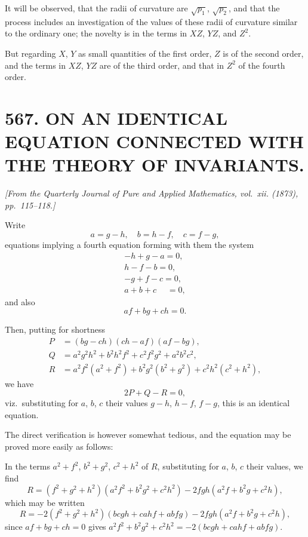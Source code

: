 \documentclass[11pt,a4paper]{article}
\theoremstyle{plain}
\theoremstyle{definition}
\theoremstyle{remark}
\newcommand{\paper}[2]{\section*{#1 #2}}
\newcommand{\papersource}[1]{\par\noindent\textit{#1}\par\medskip}
\begin{document}
It will be observed, that the radii of curvature are $\sqrt{p_1}$, $\sqrt{p_2}$, and that the process includes an investigation of the values of these radii of curvature similar to the ordinary one; the novelty is in the terms in $XZ$, $YZ$, and $Z^2$.

But regarding $X$, $Y$ as small quantities of the first order, $Z$ is of the second order, and the terms in $XZ$, $YZ$ are of the third order, and that in $Z^2$ of the fourth order.

\newpage
\paper{567.}{ON AN IDENTICAL EQUATION CONNECTED WITH THE THEORY OF INVARIANTS.}

\papersource{[From the Quarterly Journal of Pure and Applied Mathematics, vol.~xii. (1873), pp.~115--118.]}

Write
\[
a = g - h, \quad b = h - f, \quad c = f - g,
\]
equations implying a fourth equation forming with them the system
\begin{gather*}
-h + g - a = 0, \\
h - f - b = 0, \\
-g + f - c = 0, \\
a + b + c \quad\; = 0,
\end{gather*}
and also
\[
af + bg + ch = 0.
\]

Then, putting for shortness
\begin{align*}
P &= (bg - ch)(ch - af)(af - bg), \\
Q &= a^2g^2h^2 + b^2h^2f^2 + c^2f^2g^2 + a^2b^2c^2, \\
R &= a^2f^2(a^2 + f^2) + b^2g^2(b^2 + g^2) + c^2h^2(c^2 + h^2),
\end{align*}
we have
\[
2P + Q - R = 0,
\]
viz.\ substituting for $a$, $b$, $c$ their values $g-h$, $h-f$, $f-g$, this is an identical equation.

The direct verification is however somewhat tedious, and the equation may be proved more easily as follows:

In the terms $a^2 + f^2$, $b^2 + g^2$, $c^2 + h^2$ of $R$, substituting for $a$, $b$, $c$ their values, we find
\[
R = (f^2 + g^2 + h^2)(a^2f^2 + b^2g^2 + c^2h^2) - 2fgh(a^2f + b^2g + c^2h),
\]
which may be written
\[
R = -2(f^2 + g^2 + h^2)(bcgh + cahf + abfg) - 2fgh(a^2f + b^2g + c^2h),
\]
since $af + bg + ch = 0$ gives $a^2f^2 + b^2g^2 + c^2h^2 = -2(bcgh + cahf + abfg)$.

\newpage
\end{document}
